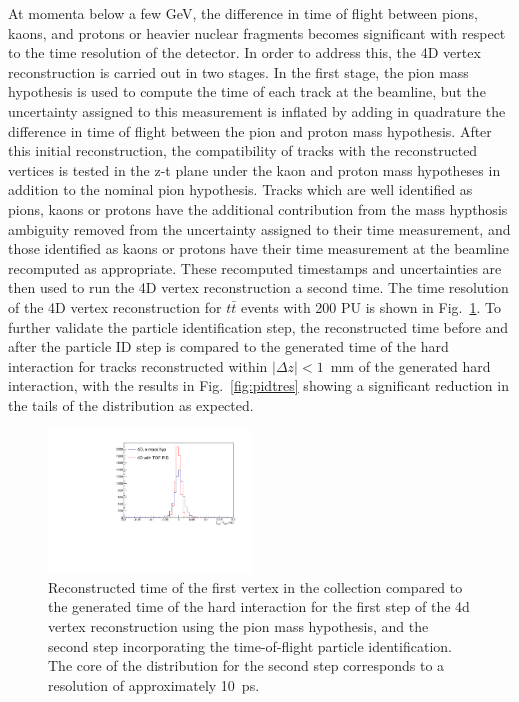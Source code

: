 At momenta below a few GeV, the difference in time of flight between pions, kaons, and protons or heavier nuclear fragments becomes significant with respect to the time resolution of the detector.  In order to address this, the 4D vertex reconstruction is carried out in two stages.  In the first stage, the pion mass hypothesis is used to compute the time of each track at the beamline, but the uncertainty assigned to this measurement is inflated by adding in quadrature the difference in time of flight between the pion and proton mass hypothesis.  After this initial reconstruction, the compatibility of tracks with the reconstructed vertices is tested in the z-t plane under the kaon and proton mass hypotheses in addition to the nominal pion hypothesis.  Tracks which are well identified as pions, kaons or protons have the additional contribution from the mass hypthosis ambiguity removed from the uncertainty assigned to their time measurement, and those identified as kaons or protons have their time measurement at the beamline recomputed as appropriate.  These recomputed timestamps and uncertainties are then used to run the 4D vertex reconstruction a second time.  The time resolution of the 4D vertex reconstruction for $t\bar t$ events with 200 PU is shown in Fig.~\ref{fig:vtxdtgen}.  To further validate the particle identification step, the reconstructed time before and after the particle ID step is compared to the generated time of the hard interaction for tracks reconstructed within $|\Delta z|<1$~mm of the generated hard interaction, with the results in Fig.~\ref{fig:pidtres} showing a significant reduction in the tails of the distribution as expected.

\begin{figure}[!hbtp]
\centering
\includegraphics[width=0.48\textwidth]{fig/performance/4dvtx/ttbarpu200/dtvtxgen.pdf}
\caption{Reconstructed time of the first vertex in the collection compared to the generated time of the hard interaction for the first step of the 4d vertex reconstruction using the pion mass hypothesis, and the second step incorporating the time-of-flight particle identification.  The core of the distribution for the second step corresponds to a resolution of approximately 10~ps.}
\label{fig:vtxdtgen}
\end{figure}

